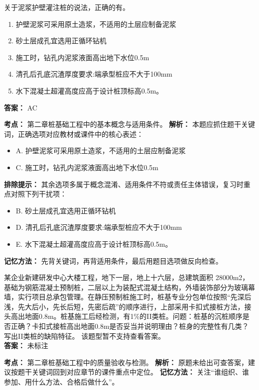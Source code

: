 \documentclass[UTF8,fontset=fandol,11pt]{ctexart}
\begin{document}
\begin{quizbox}[title={第 11 题}]
关于泥浆护壁灌注桩的说法，正确的有。\\
\begin{enumerate}[label=\Alph*.]
\item 护壁泥浆可采用原土造浆，不适用的土层应制备泥浆
\item 砂土层成孔宜选用正循环钻机
\item 施工时，钻孔内泥浆液面高出地下水位0.5m
\item 清孔后孔底沉渣厚度要求:端承型桩应不大于100mm
\item 水下混凝土超灌高度应高于设计桩顶标高0.5m。
\end{enumerate}
\textbf{答案：} AC
\vspace{0.25em}
\begin{answerbox}[title={考点解析}]
\textbf{考点：} 第二章桩基础工程中的基本概念与适用条件。
\textbf{解析：} 本题应抓住题干关键词，正确选项对应教材或课件中的核心表述：
\begin{itemize}
\item A. 护壁泥浆可采用原土造浆，不适用的土层应制备泥浆
\item C. 施工时，钻孔内泥浆液面高出地下水位0.5m
\end{itemize}
\textbf{排除提示：} 其余选项多属于概念混淆、适用条件不符或责任主体错误，复习时重点对照下列干扰项：
\begin{itemize}
\item B. 砂土层成孔宜选用正循环钻机
\item D. 清孔后孔底沉渣厚度要求:端承型桩应不大于100mm
\item E. 水下混凝土超灌高度应高于设计桩顶标高0.5m。
\end{itemize}
\textbf{记忆方法：} 先背关键词，再背适用条件，最后用题目选项做反向检查。
\end{answerbox}
\end{quizbox}

\vspace{0.2em}

\begin{quizbox}[title={第 12 题}]
某企业新建研发中心大楼工程，地下一层，地上十六层，总建筑面积 28000m2，基础为钢筋混凝土预制桩，二层以上为装配式混凝土结构，外墙装饰部分为玻璃幕墙，实行项目总承包管理。在静压预制桩施工时，桩基专业分包单位按照“先深后浅，先大后小，先长后短，先密后疏”的顺序进行，上部采用卡扣式接桩方法，接头高出地面0.8m。桩基施工后经检测，有1\%的II类桩。问题：桩基的沉桩顺序是否正确？卡扣式接桩高出地面0.8m是否妥当并说明理由？桩身的完整性有几类？写出II类桩的缺陷特征。 该题型暂不支持查看答案。\\
\textbf{答案：} 未标注
\vspace{0.25em}
\begin{answerbox}[title={考点解析}]
\textbf{考点：} 第二章桩基础工程中的质量验收与检测。
\textbf{解析：} 原题未给出可查答案，建议按题干关键词回到对应章节的课件重点中定位。
\textbf{记忆方法：} 关注“谁组织、谁参加、用什么方法、合格后做什么”。
\end{answerbox}
\end{quizbox}
\end{document}

